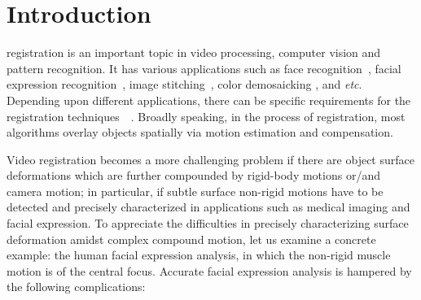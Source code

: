 \documentclass[10pt,journal]{IEEEtran}
\begin{document}
\maketitle


\IEEEdisplaynotcompsoctitleabstractindextext


%
\IEEEpeerreviewmaketitle


\section{Introduction\label{sec:intro}}

 registration is an important topic in video processing, computer vision and pattern recognition. It has various applications such as face recognition~\cite{Wagner2009}, facial expression recognition~\cite{Valstar12}, image stitching~\cite{Szeliski06}, color demosaicking \cite{Wu_TIP06}, and \textit{etc}. Depending upon different applications, there can be specific requirements for the registration techniques~\cite{Uenohara95}~\cite{Caspi_PAMI02}. Broadly speaking, in the process of registration, most algorithms overlay objects spatially via motion estimation and compensation. 

Video registration becomes a more challenging problem if there are object surface deformations which are further compounded by rigid-body motions or/and camera motion; in particular, if subtle surface non-rigid motions have to be detected and precisely characterized in applications such as medical imaging and facial expression. To appreciate the difficulties in precisely characterizing surface deformation amidst complex compound motion, let us examine a concrete example: the human facial expression analysis, in which the non-rigid muscle motion is of the central focus.  Accurate facial expression analysis is hampered by the following complications:
\end{document}
